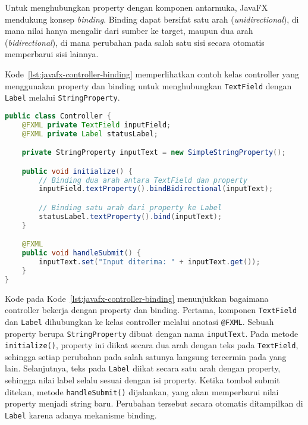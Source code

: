 Untuk menghubungkan property dengan komponen antarmuka, JavaFX mendukung konsep \textit{binding}. Binding dapat bersifat satu arah (\textit{unidirectional}), di mana nilai hanya mengalir dari sumber ke target, maupun dua arah (\textit{bidirectional}), di mana perubahan pada salah satu sisi secara otomatis memperbarui sisi lainnya.  

Kode~\ref{lst:javafx-controller-binding} memperlihatkan contoh kelas controller yang menggunakan property dan binding untuk menghubungkan \texttt{TextField} dengan \texttt{Label} melalui \texttt{StringProperty}.  

\begin{lstlisting}[language=Java, caption=Contoh controller dengan property dan binding, label=lst:javafx-controller-binding]
public class Controller {
    @FXML private TextField inputField;
    @FXML private Label statusLabel;

    private StringProperty inputText = new SimpleStringProperty();

    public void initialize() {
        // Binding dua arah antara TextField dan property
        inputField.textProperty().bindBidirectional(inputText);

        // Binding satu arah dari property ke Label
        statusLabel.textProperty().bind(inputText);
    }

    @FXML
    public void handleSubmit() {
        inputText.set("Input diterima: " + inputText.get());
    }
}
\end{lstlisting}

Kode pada Kode~\ref{lst:javafx-controller-binding} menunjukkan bagaimana controller bekerja dengan property dan binding. Pertama, komponen \texttt{TextField} dan \texttt{Label} dihubungkan ke kelas controller melalui anotasi \texttt{@FXML}. Sebuah property berupa \texttt{StringProperty} dibuat dengan nama \texttt{inputText}. Pada metode \texttt{initialize()}, property ini diikat secara dua arah dengan teks pada \texttt{TextField}, sehingga setiap perubahan pada salah satunya langsung tercermin pada yang lain. Selanjutnya, teks pada \texttt{Label} diikat secara satu arah dengan property, sehingga nilai label selalu sesuai dengan isi property. Ketika tombol submit ditekan, metode \texttt{handleSubmit()} dijalankan, yang akan memperbarui nilai property menjadi string baru. Perubahan tersebut secara otomatis ditampilkan di \texttt{Label} karena adanya mekanisme binding.
